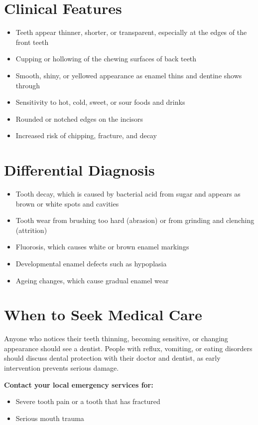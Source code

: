 \section*{Clinical Features}
\begin{itemize}
    \item Teeth appear thinner, shorter, or transparent, especially at the edges of the front teeth
    \item Cupping or hollowing of the chewing surfaces of back teeth
    \item Smooth, shiny, or yellowed appearance as enamel thins and dentine shows through
    \item Sensitivity to hot, cold, sweet, or sour foods and drinks
    \item Rounded or notched edges on the incisors
    \item Increased risk of chipping, fracture, and decay
\end{itemize}

\section*{Differential Diagnosis}
\begin{itemize}
    \item Tooth decay, which is caused by bacterial acid from sugar and appears as brown or white spots and cavities
    \item Tooth wear from brushing too hard (abrasion) or from grinding and clenching (attrition)
    \item Fluorosis, which causes white or brown enamel markings
    \item Developmental enamel defects such as hypoplasia
    \item Ageing changes, which cause gradual enamel wear
\end{itemize}

\section*{When to Seek Medical Care}
Anyone who notices their teeth thinning, becoming sensitive, or changing appearance should see a dentist. People with reflux, vomiting, or eating disorders should discuss dental protection with their doctor and dentist, as early intervention prevents serious damage.

\textbf{Contact your local emergency services for:}
\begin{itemize}
    \item Severe tooth pain or a tooth that has fractured
    \item Serious mouth trauma
\end{itemize}

